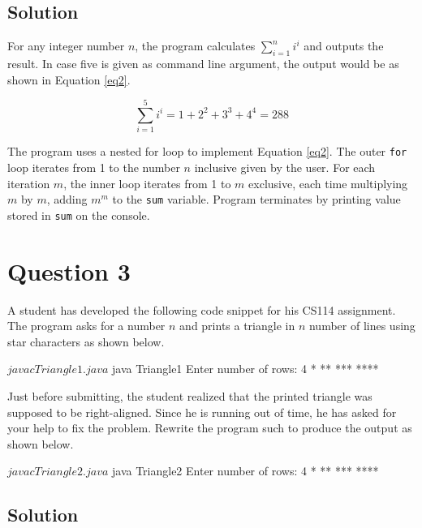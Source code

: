 \documentclass[12pt,letterpaper,twoside]{article}
\begin{document}
\subsection*{Solution}

For any integer number $n$, the program calculates $\sum\limits_{i=1}^n i^i$ and outputs the result.
In case five is given as command line argument, the output would be as shown in Equation \ref{eq2}.

\begin{equation}
\sum\limits_{i=1}^5 i^i = 1 + 2^2 + 3^3 + 4^4 = 288
\label{eq2}
\end{equation}

The program uses a nested for loop to implement Equation \ref{eq2}.
The outer \texttt{for} loop iterates from 1 to the number $n$ inclusive given by the user.
For each iteration $m$, the inner loop iterates from 1 to $m$ exclusive, each time multiplying $m$ by $m$, adding $m^m$ to the \texttt{sum} variable.
Program terminates by printing value stored in \texttt{sum} on the console.

\newpage

\section*{Question 3}

A student has developed the following code snippet for his CS114 assignment.
The program asks for a number $n$ and prints a triangle in $n$ number of lines
using star characters as shown below.



\begin{terminal}
$ javac Triangle1.java
$ java Triangle1
Enter number of rows: 4
*
**
***
****
\end{terminal}

Just before submitting, the student realized that the printed triangle was supposed to be right-aligned.
Since he is running out of time, he has asked for your help to fix the problem.
Rewrite the program such to produce the output as shown below.

\begin{terminal}
$ javac Triangle2.java
$ java Triangle2
Enter number of rows: 4
   *
  **
 ***
****
\end{terminal}

\subsection*{Solution}
\end{document}
